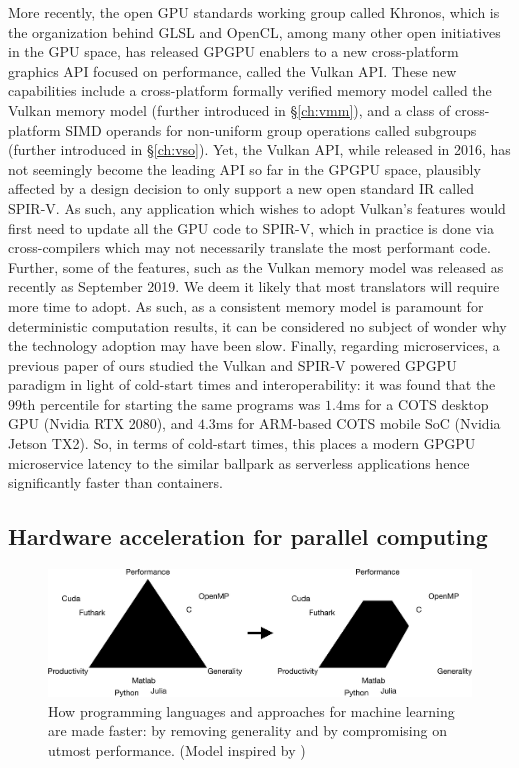 \documentclass{IEEEtran}
\begin{document}
More recently, the open \gls{GPU} standards working group called Khronos, which is the organization behind \gls{GLSL} and OpenCL, among many other open initiatives in the \gls{GPU} space, has released \gls{GPGPU} enablers to a new cross-platform graphics \gls{API} focused on performance, called the Vulkan \gls{API}. These new capabilities include a cross-platform formally verified memory model called the Vulkan memory model (further introduced in §\ref{ch:vmm}), and a class of cross-platform \gls{SIMD} operands for non-uniform group operations called subgroups (further introduced in §\ref{ch:vso}). Yet, the Vulkan \gls{API}, while released in 2016, has not seemingly become the leading \gls{API} so far in the \gls{GPGPU} space, plausibly affected by a design decision to only support a new open standard \gls{IR} called SPIR-V. As such, any application which wishes to adopt Vulkan's features would first need to update all the \gls{GPU} code to \gls{SPIR-V}, which in practice is done via cross-compilers which may not necessarily translate the most performant code. Further, some of the features, such as the Vulkan memory model was released as recently as September 2019. We deem it likely that most translators will require more time to adopt. As such, as a consistent memory model is paramount for deterministic computation results, it can be considered no subject of wonder why the technology adoption may have been slow. Finally, regarding microservices, a previous paper of ours \cite{haavisto2020interoperable} studied the Vulkan and SPIR-V powered \gls{GPGPU} paradigm in light of cold-start times and interoperability: it was found that the 99th percentile for starting the same programs was $1.4$ms for a \gls{COTS} desktop GPU (Nvidia RTX 2080), and $4.3$ms for ARM-based \gls{COTS} mobile \gls{SoC} (Nvidia Jetson TX2). So, in terms of cold-start times, this places a modern \gls{GPGPU} microservice latency to the similar ballpark as serverless applications hence significantly faster than containers.

\subsection{Hardware acceleration for parallel computing}

\begin{figure}
  \centering
  \includegraphics[width=\columnwidth*2]{./assets/tric.pdf}
  \caption{How programming languages and approaches for machine learning are made faster: by removing generality and by compromising on utmost performance. (Model inspired by \cite{brown2011heterogeneous})}
  \label{fig:tri0}
\end{figure}
\end{document}
